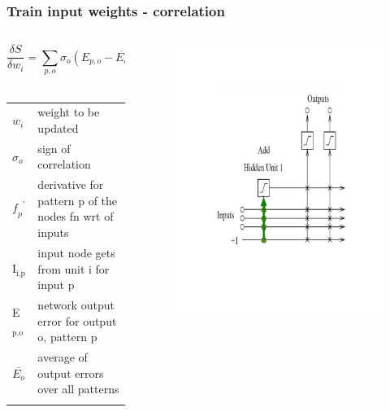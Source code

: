 \documentclass{beamer}
\begin{document}
\begin{frame}
  \frametitle{Train input weights - correlation}
	\begin{columns}[t]
		\begin{column}{0.5\textwidth}
      $$ \frac{\delta S}{\delta w_{i}} = \sum_{p,o} \sigma_{o}(E_{p,o} - \overline{E_{o}}) \mathit{f_{p}}^{\prime} I_{i,p} $$
     \\ 
      \begin{center}
        \begin{tabular}{ll}
          \(\mathit{w_{i}}\) & \tiny{weight to be updated}  \\
          \(\sigma_{o}\) & \tiny{sign of correlation}  \\
          \(\mathit{f_{p}}^{\prime}\) & \tiny{derivative for pattern p of the nodes fn wrt of inputs} \\
          I\(_{\text{i,p}}\) & \tiny{input node gets from unit i for input p}  \\
          E\(_{\text{p,o}}\) & \tiny{network output error for output o, pattern p} \\
          \(\overline{E_{o}}\) & \tiny{average of output errors over all patterns} \\
          & \\
        \end{tabular}
      \end{center}
		\end{column}
		\begin{column}{0.5\textwidth}
      \begin{figure}
        \centering
        \includegraphics[scale=0.5]{trainInputunit.png}

\end{figure}
\end{column}
\end{columns}
\end{frame}
\end{document}
